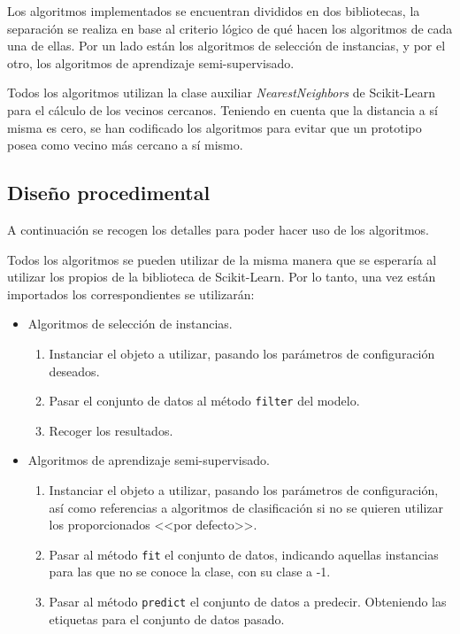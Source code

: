 Los algoritmos implementados se encuentran divididos en dos bibliotecas, la separación se realiza en base al criterio lógico de qué hacen los algoritmos de cada una de ellas. Por un lado están los algoritmos de selección de instancias, y por el otro, los algoritmos de aprendizaje semi-supervisado.

Todos los algoritmos utilizan la clase auxiliar \textit{NearestNeighbors} de Scikit-Learn~\cite{NearestNeighbors} para el cálculo de los vecinos cercanos. Teniendo en cuenta que la distancia a sí misma es cero, se han codificado los algoritmos para evitar que un prototipo posea como vecino más cercano a sí mismo.

\subsection{Diseño procedimental}
A continuación se recogen los detalles para poder hacer uso de los algoritmos.

Todos los algoritmos se pueden utilizar de la misma manera que se esperaría al utilizar los propios de la biblioteca de Scikit-Learn. Por lo tanto, una vez están importados los correspondientes se utilizarán:
\begin{itemize}
\item Algoritmos de selección de instancias.
\begin{enumerate}
	\item Instanciar el objeto a utilizar, pasando los parámetros de configuración deseados.
	\item Pasar el conjunto de datos al método \texttt{filter} del modelo.
	\item Recoger los resultados.
\end{enumerate}
\item Algoritmos de aprendizaje semi-supervisado.
\begin{enumerate}
\item Instanciar el objeto a utilizar, pasando los parámetros de configuración, así como referencias a algoritmos de clasificación si no se quieren utilizar los proporcionados <<por defecto>>.
\item Pasar al método \texttt{fit} el conjunto de datos, indicando aquellas instancias para las que no se conoce la clase, con su clase a -1.
\item Pasar al método \texttt{predict} el conjunto de datos a predecir. Obteniendo las etiquetas para el conjunto de datos pasado.
\end{enumerate}
\end{itemize}

